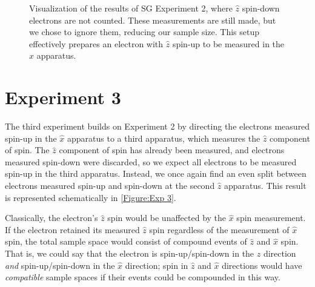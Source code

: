 \begin{figure}
\centering\CaptionFontSize
{}

\caption[Re-normalized results of Stern-Gerlach Experiment 2]
{Visualization of the results of SG Experiment 2, where $\hat{z}$ spin-down electrons are not counted. These measurements are still made, but we chose to ignore them, reducing our sample size. This setup effectively prepares an electron with $\hat{z}$ spin-up to be measured in the $\hat{x}$ apparatus.}
\label{Figure:Exp 2 renormalized}
\end{figure}

\section{Experiment 3}
The third experiment builds on Experiment 2 by directing the electrons measured spin-up in the $\hat{x}$ apparatus to a third apparatus, which measures the $\hat{z}$ component of spin. The $\hat{z}$ component of spin has already been measured, and electrons measured spin-down were discarded, so we expect all electrons to be measured spin-up in the third apparatus. Instead, we once again find an even split between electrons measured spin-up and spin-down at the second $\hat{z}$ apparatus. This result is represented schematically in \autoref{Figure:Exp 3}.

Classically, the electron's $\hat{z}$ spin would be unaffected by the $\hat{x}$ spin measurement. If the electron retained its measured $\hat{z}$ spin regardless of the measurement of $\hat{x}$ spin, the total sample space would consist of compound events of $\hat{z}$ and $\hat{x}$ spin. That is, we could say that the electron is spin-up/spin-down in the $\hat{z}$ direction \textit{and} spin-up/spin-down in the $\hat{x}$ direction; spin in $\hat{z}$ and $\hat{x}$ directions would have \textit{compatible} sample spaces if their events could be compounded in this way.

